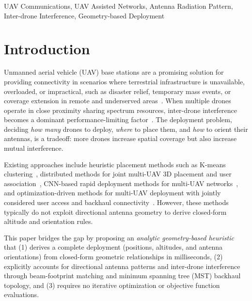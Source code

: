 \documentclass[conference]{IEEEtran}
\begin{document}
\begin{IEEEkeywords}
UAV Communications, UAV Assisted Networks, Antenna Radiation Pattern, Inter-drone Interference, Geometry-based Deployment
\end{IEEEkeywords}

\section{Introduction}
\label{sec:intro}

Unmanned aerial vehicle (UAV) base stations are a promising solution for providing connectivity in scenarios where terrestrial infrastructure is unavailable, overloaded, or impractical, such as disaster relief, temporary mass events, or coverage extension in remote and underserved areas~\cite{qiu2019,elhammouti2019,hydher2020}.
When multiple drones operate in close proximity sharing spectrum resources, inter-drone interference becomes a dominant performance-limiting factor~\cite{betchersbrolla2025}. The deployment problem, deciding \emph{how many} drones to deploy, \emph{where} to place them, and \emph{how} to orient their antennas, is a tradeoff: more drones increase spatial coverage but also increase mutual interference.

Existing approaches include heuristic placement methods such as K-means clustering~\cite{consul2024}, distributed methods for joint multi-UAV 3D placement and user association~\cite{elhammouti2019}, CNN-based rapid deployment methods for multi-UAV networks~\cite{wang2024}, and optimization-driven methods for multi-UAV deployment with jointly considered user access and backhaul connectivity~\cite{wang2025multiuav}. However, these methods typically do not exploit directional antenna geometry to derive closed-form altitude and orientation rules.

This paper bridges the gap by proposing an \emph{analytic geometry-based heuristic} that (1) derives a complete deployment (positions, altitudes, and antenna orientations) from closed-form geometric relationships in milliseconds, (2) explicitly accounts for directional antenna patterns and inter-drone interference through beam-footprint matching and minimum spanning tree (MST) backhaul topology, and (3) requires no iterative optimization or objective function evaluations.
\end{document}
